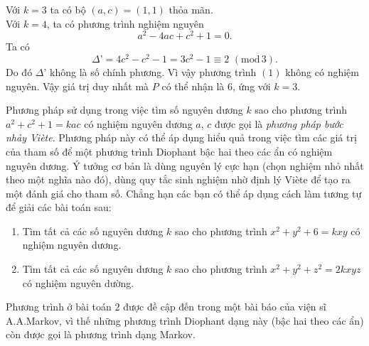 \begin{bt}
{\begin{enumerate}
			Với $k=3$ ta có bộ $(a,c)=(1,1)$ thỏa mãn.\\
			Với $k=4$, ta có phương trình nghiệm nguyên $$a^2-4ac+c^2+1=0.$$
			Ta có $$\Delta’=4c^2-c^2-1=3c^2-1\equiv 2\,\, (\mathrm{mod\,}3).$$
			Do đó $\Delta’$ không là số chính phương. Vì vậy phương trình $(1)$ không có nghiệm nguyên.
			Vậy giá trị duy nhất mà $P$ có thể nhận là $6$, ứng với $k=3$.
			\begin{nx}
				Phương pháp sử dụng trong việc tìm số nguyên dương $k$ sao cho phương trình $a^2+c^2+1=kac$ có nghiệm nguyên dương $a$, $c$ được gọi là \textit{phương pháp bước nhảy Viète}. Phương pháp này có thể áp dụng hiểu quả trong việc tìm các giá trị của tham số để một phương trình Diophant bậc hai theo các ẩn có nghiệm nguyên dương. Ý tưởng cơ bản là dùng nguyên lý cực hạn (chọn nghiệm nhỏ nhất theo một nghĩa nào đó), dùng quy tắc sinh nghiệm nhờ định lý Viète để tạo ra một đánh giá cho tham số. Chẳng hạn các bạn có thể áp dụng cách làm tương tự để giải các bài toán sau:
				\begin{enumerate}[1.]
					\item Tìm tất cả các số nguyên dương $k$ sao cho phương trình $x^2+y^2+6=kxy$ có nghiệm nguyên dương.
					\item Tìm tất cả các số nguyên dương $k$ sao cho phương trình $x^2+y^2+z^2=2kxyz$ có nghiệm nguyên dường. 
				\end{enumerate}
				Phương trình ở bài toán $2$ được đề cập đến trong một bài báo của viện sĩ A.A.Markov, vì thế những phương trình Diophant dạng này (bậc hai theo các ẩn) còn được gọi là phương trình dạng Markov.
			\end{nx}			
		\end{enumerate}
	}
\end{bt}
